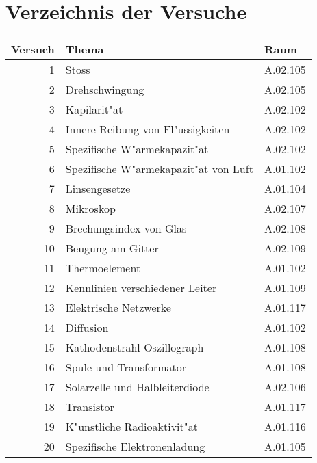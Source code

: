 
\chapter{Verzeichnis der Versuche}

\begin{table}[h!]
 \centering
 \begin{tabular}{rll}
 \toprule
 Versuch & Thema & Raum\\
 \midrule
 1 & Stoss & A.02.105\\
 2 & Drehschwingung & A.02.105\\ 
 3 & Kapilarit"at & A.02.102 \\ 
 4 & Innere Reibung von Fl"ussigkeiten & A.02.102 \\ 
 5 & Spezifische W"armekapazit"at & A.02.102 \\ 
 6 & Spezifische W"armekapazit"at von Luft & A.01.102 \\ 
 7 & Linsengesetze & A.01.104 \\ 
 8 & Mikroskop & A.02.107 \\ 
 9 & Brechungsindex von Glas & A.02.108 \\ 
 10 & Beugung am Gitter & A.02.109\\ 
 11 & Thermoelement & A.01.102 \\ 
 12 & Kennlinien verschiedener Leiter & A.01.109 \\ 
 13 & Elektrische Netzwerke & A.01.117 \\ 
 14 & Diffusion & A.01.102\\ 
 15 & Kathodenstrahl-Oszillograph & A.01.108 \\ 
 16 & Spule und Transformator & A.01.108 \\ 
 17 & Solarzelle und Halbleiterdiode & A.02.106\\ 
 18 & Transistor & A.01.117 \\ 
 19 & K"unstliche Radioaktivit"at & A.01.116 \\ 
 20 & Spezifische Elektronenladung & A.01.105 \\ 
 \bottomrule
 \end{tabular}
\end{table}
  